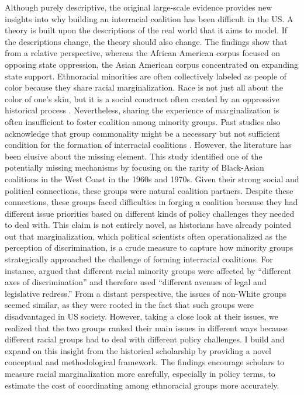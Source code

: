 \documentclass[12 pt]{article}
\begin{document}
Although purely descriptive, the original large-scale evidence provides new insights into why building an interracial coalition has been difficult in the US. A theory is built upon the descriptions of the real world that it aims to model. If the descriptions change, the theory should also change. The findings show that from a relative perspective, whereas the African American corpus focused on opposing state oppression, the Asian American corpus concentrated on expanding state support. Ethnoracial minorities are often collectively labeled as people of color because they share racial marginalization. Race is not just all about the color of one's skin, but it is a social construct often created by an oppressive historical process \citep{omi_racial_1994}. Nevertheless, sharing the experience of marginalization is often insufficient to foster coalition among minority groups. Past studies also acknowledge that group commonality might be a necessary but not sufficient condition for the formation of interracial coalitions \citep[201]{kaufmann2003cracks}. However, the literature has been elusive about the missing element. This study identified one of the potentially missing mechanisms by focusing on the rarity of Black-Asian coalitions in the West Coast in the 1960s and 1970s. Given their strong social and political connections, these groups were natural coalition partners. Despite these connections, these groups faced difficulties in forging a coalition because they had different issue priorities based on different kinds of policy challenges they needed to deal with. This claim is not entirely novel, as historians have already pointed out that marginalization, which political scientists often operationalized as the perception of discrimination, is a crude measure to capture how minority groups strategically approached the challenge of forming interracial coalitions. For instance, \citet[210]{brilliant2010color} argued that different racial minority groups were affected by “different axes of discrimination” and therefore used “different avenues of legal and legislative redress.” From a distant perspective, the issues of non-White groups seemed similar, as they were rooted in the fact that such groups were disadvantaged in US society. However, taking a close look at their issues, we realized that the two groups ranked their main issues in different ways because different racial groups had to deal with different policy challenges. I build and expand on this insight from the historical scholarship by providing a novel conceptual and methodological framework. The findings encourage scholars to measure racial marginalization more carefully, especially in policy terms, to estimate the cost of coordinating among ethnoracial groups more accurately. 
\end{document}

